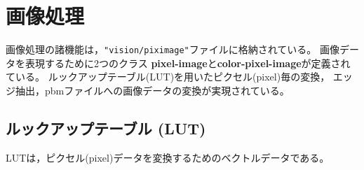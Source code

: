 \section{画像処理}

画像処理の諸機能は，{\tt "vision/piximage"}ファイルに格納されている。
画像データを表現するために2つのクラス
{\bf pixel-image}と{\bf color-pixel-image}が定義されている。
ルックアップテーブル(LUT)を用いたピクセル(pixel)毎の変換，
エッジ抽出，pbmファイルへの画像データの変換が実現されている。

\subsection{ルックアップテーブル (LUT)}
LUTは，ピクセル(pixel)データを変換するためのベクトルデータである。 

